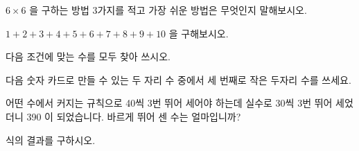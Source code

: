 \documentclass[a4paper,15pt]{exam}
\begin{document}
\begin{questions}



\question
$6\times6$ 을 구하는 방법 3가지를 적고 가장 쉬운 방법은 무엇인지 말해보시오.


\question
$1 + 2 + 3 + 4 + 5 + 6 + 7 + 8 + 9 + 10$ 을 구해보시오. 


\newpage


\question
    다음 조건에 맞는 수를 모두 찾아 쓰시오.

    \begin{center}
    \end{center}



\question
    다음 숫자 카드로 만들 수 있는 두 자리 수 중에서 세 번째로 작은 두자리 수를 쓰세요. 
    
    \begin{center}
           
    \end{center}



\question
    어떤 수에서 커지는 규칙으로 40씩 3번 뛰어 세어야 하는데 실수로 30씩 3번 뛰어 세었더니 390 이 되었습니다. 바르게 뛰어 센 수는 얼마입니까?


\question
    식의 결과를 구하시오.
\end{questions}
\end{document}
